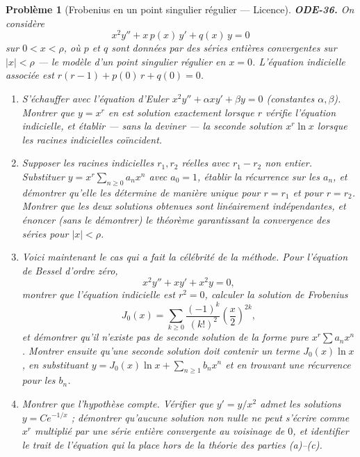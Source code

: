 \documentclass[11pt]{article}
\newtheorem{problem}{Problème}
\begin{document}
\begin{problem}[{Frobenius en un point singulier régulier --- Licence}]
\textbf{ODE-36.} On considère
\[ x^2 y'' + x\,p(x)\,y' + q(x)\,y = 0 \]
sur $ 0 < x < \rho $, où $ p $ et $ q $ sont données par des séries entières
convergentes sur $ |x| < \rho $ --- le modèle d'un \textit{point singulier régulier} en
$ x = 0 $. L'équation indicielle associée est $ r(r-1) + p(0)\,r + q(0) = 0 $.
\begin{enumerate}
\item[(a)] S'échauffer avec l'équation d'Euler $ x^2 y'' + \alpha x y' + \beta y = 0 $ (constantes
$ \alpha, \beta $). Montrer que $ y = x^r $ en est solution exactement lorsque $ r $
vérifie l'équation indicielle, et établir --- sans la deviner --- la seconde solution
$ x^r \ln x $ lorsque les racines indicielles coïncident.
\item[(b)] Supposer les racines indicielles $ r_1, r_2 $ réelles avec $ r_1 - r_2 $ non entier.
Substituer $ y = x^{r}\sum_{n \ge 0} a_n x^n $ avec $ a_0 = 1 $, établir la récurrence sur
les $ a_n $, et démontrer qu'elle les détermine de manière unique pour $ r = r_1 $ et pour
$ r = r_2 $. Montrer que les deux solutions obtenues sont linéairement indépendantes, et
énoncer (sans le démontrer) le théorème garantissant la convergence des séries pour
$ |x| < \rho $.
\item[(c)] Voici maintenant le cas qui a fait la célébrité de la méthode. Pour l'équation de Bessel
d'ordre zéro,
\[ x^2 y'' + x y' + x^2 y = 0, \]
montrer que l'équation indicielle est $ r^2 = 0 $, calculer la solution de Frobenius
\[ J_0(x) = \sum_{k \ge 0} \frac{(-1)^k}{(k!)^2}\left(\frac{x}{2}\right)^{2k}, \]
et démontrer qu'il n'existe pas de seconde solution de la forme pure $ x^{r}\sum a_n x^n $.
Montrer ensuite qu'une seconde solution doit contenir un terme $ J_0(x)\ln x $, en substituant
$ y = J_0(x)\ln x + \sum_{n \ge 1} b_n x^n $ et en trouvant une récurrence pour les
$ b_n $.
\item[(d)] Montrer que l'hypothèse compte. Vérifier que $ y' = y/x^2 $ admet les solutions
$ y = C e^{-1/x} $ ; démontrer qu'aucune solution non nulle ne peut s'écrire comme $ x^r $
multiplié par une série entière convergente au voisinage de $ 0 $, et identifier le trait de
l'équation qui la place hors de la théorie des parties (a)--(c).
\end{enumerate}

\end{problem}
\end{document}
